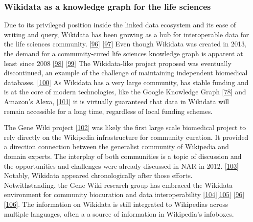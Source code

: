 \hypertarget{wikidata-as-a-knowledge-graph-for-the-life-sciences}{%
\subsubsection{Wikidata as a knowledge graph for the life sciences}\label{wikidata-as-a-knowledge-graph-for-the-life-sciences}}

Due to its privileged position inside the linked data ecosystem and its ease of writing and query, Wikidata has been growing as a hub for interoperable data for the life sciences community. {[}\protect\hyperlink{ref-3GqlN9Dk}{96}{]} {[}\protect\hyperlink{ref-Ym2HoRLl}{97}{]}
Even though Wikidata was created in 2013, the demand for a community-cured life sciences knowledge graph is apparent at least since 2008 {[}\protect\hyperlink{ref-179mXrGIk}{98}{]} {[}\protect\hyperlink{ref-TItj7EYf}{99}{]}
The Wikidata-like project proposed was eventually discontinued, an example of the challenge of maintaining independent biomedical databases. {[}\protect\hyperlink{ref-P2QdZvGc}{100}{]}
As Wikidata has a very large community, has stable funding and is at the core of modern technologies, like the Google Knowledge Graph {[}\protect\hyperlink{ref-xLpRePoh}{78}{]} and Amazon's Alexa, {[}\protect\hyperlink{ref-bO7BekzO}{101}{]} it is virtually guaranteed that data in Wikidata will remain accessible for a long time, regardless of local funding schemes.

The Gene Wiki project {[}\protect\hyperlink{ref-18UXATsxP}{102}{]} was likely the first large scale biomedical project to rely directly on the Wikipedia infrastructure for community curation.
It provided a direction connection between the generalist community of Wikipedia and domain experts.
The interplay of both communities is a topic of discussion and the opportunities and challenges were already discussed in NAR in 2012. {[}\protect\hyperlink{ref-13LWXQF0E}{103}{]}\\
Notably, Wikidata appeared chronologically after those efforts.\\
Notwithstanding, the Gene Wiki research group has embraced the Wikidata environment for community biocuration and data interoperability {[}\protect\hyperlink{ref-2ZhxC0dg}{104}{]}{[}\protect\hyperlink{ref-DaJdrXLk}{105}{]} {[}\protect\hyperlink{ref-3GqlN9Dk}{96}{]} {[}\protect\hyperlink{ref-aQfGxPRH}{106}{]}.
The information on Wikidata is still integrated to Wikipedias across multiple languages, often a a source of information in Wikipedia's infoboxes.

